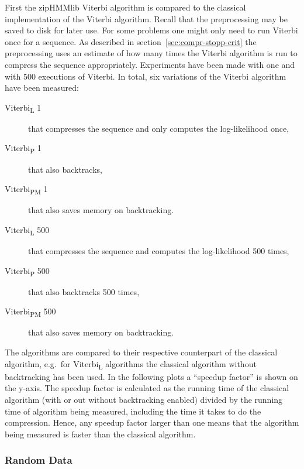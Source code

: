First the zipHMMlib Viterbi algorithm is compared to the classical
implementation of the Viterbi algorithm. Recall that the preprocessing may be
saved to disk for later use. For some problems one might only need to run
Viterbi once for a sequence. As described in section~\ref{sec:compr-stopp-crit}
the preprocessing uses an estimate of how many times the Viterbi algorithm is
run to compress the sequence appropriately. Experiments have been made with one
and with 500 executions of Viterbi. In total, six variations of the Viterbi
algorithm have been measured:
\begin{description}
\item[Viterbi\textsubscript{L} 1] that compresses the sequence and only computes the
  log-likelihood once,
\item[Viterbi\textsubscript{P} 1] that also backtracks,
\item[Viterbi\textsubscript{PM} 1] that also saves memory on backtracking.
\item[Viterbi\textsubscript{L} 500] that compresses the sequence and computes the
  log-likelihood 500 times,
\item[Viterbi\textsubscript{P} 500] that also backtracks 500 times,
\item[Viterbi\textsubscript{PM} 500] that also saves memory on backtracking.
\end{description}

The algorithms are compared to their respective counterpart of the classical
algorithm, e.g.\ for Viterbi\textsubscript{L} algorithms the classical
algorithm without backtracking has been used. In the following plots a
``speedup factor'' is shown on the y-axis. The speedup factor is calculated as
the running time of the classical algorithm (with or out without backtracking
enabled) divided by the running time of algorithm being measured, including the
time it takes to do the compression. Hence, any speedup factor larger than one
means that the algorithm being measured is faster than the classical algorithm.

\subsubsection{Random Data}

